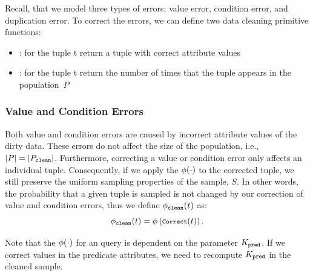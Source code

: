 Recall, that we model three types of errors: value error, condition error, and duplication error.
To correct the errors, we can define two data cleaning primitive functions:
\begin{itemize}\vspace{-.5em}
\item {}: for the tuple t return a tuple with correct attribute values\vspace{-.5em}
\item {}: for the tuple t return the number of times that the tuple appears in the population~$P$ 
\end{itemize}


\subsubsection{Value and Condition Errors}
Both value and condition errors are caused by incorrect attribute values of the dirty data.
These errors do not affect the size of the population, i.e., $|P| = |P_{\texttt{clean} }|$.
Furthermore, correcting a value or condition error only affects an individual tuple.
Consequently, if we apply the $\phi (\cdot)$ to the corrected tuple, we still preserve the uniform sampling properties of the sample, $S$.
In other words, the probability that a given tuple is sampled is not changed by our correction of value and condition errors, thus we define $\phi_{\texttt{clean} } (t)$ as:
\begin{equation}\small
\saqpplusfunc(t) = \saqpfunc \left( \Correct{t} \right).
\end{equation}

Note that the $\phi (\cdot)$ for an \avgfunc query is dependent on the parameter $K_{\texttt{pred} }$. 
If we correct values in the predicate attributes, we need to recompute $K_{\texttt{pred} }$ in the cleaned sample.

